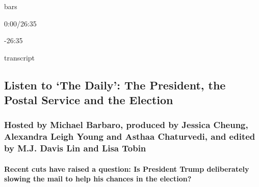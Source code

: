 bars

0:00/26:35

-26:35

transcript

\hypertarget{listen-to-the-daily-the-president-the-postal-service-and-the-election-1}{%
\subsection{Listen to `The Daily': The President, the Postal Service and
the
Election}\label{listen-to-the-daily-the-president-the-postal-service-and-the-election-1}}

\hypertarget{hosted-by-michael-barbaro-produced-by-jessica-cheung-alexandra-leigh-young-and-asthaa-chaturvedi-and-edited-by-mj-davis-lin-and-lisa-tobin}{%
\subsubsection{Hosted by Michael Barbaro, produced by Jessica Cheung,
Alexandra Leigh Young and Asthaa Chaturvedi, and edited by M.J. Davis
Lin and Lisa
Tobin}\label{hosted-by-michael-barbaro-produced-by-jessica-cheung-alexandra-leigh-young-and-asthaa-chaturvedi-and-edited-by-mj-davis-lin-and-lisa-tobin}}

\hypertarget{recent-cuts-have-raised-a-question-is-president-trump-deliberately-slowing-the-mail-to-help-his-chances-in-the-election}{%
\paragraph{Recent cuts have raised a question: Is President Trump
deliberately slowing the mail to help his chances in the
election?}\label{recent-cuts-have-raised-a-question-is-president-trump-deliberately-slowing-the-mail-to-help-his-chances-in-the-election}}

